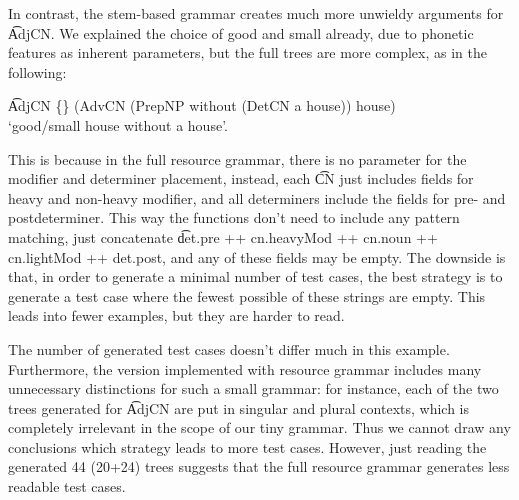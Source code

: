 In contrast, the stem-based grammar creates much more unwieldy
arguments for \t{AdjCN}. We explained the choice of good and small
already, due to phonetic features as inherent parameters, but the full
trees are more complex, as in the following:

\begin{EmptyItem}
\t{AdjCN \{\} (AdvCN (PrepNP without (DetCN a house))
  house)} \\ `good/small house without a house'.
\end{EmptyItem}

\noindent This is because in the full resource grammar, there is no parameter
for the modifier and determiner placement, instead, each \t{CN} just
includes fields for heavy and non-heavy modifier, and all determiners
include the fields for pre- and postdeterminer. This way the functions
don't need to include any pattern matching, just concatenate
\t{det.pre ++ cn.heavyMod ++ cn.noun ++ cn.lightMod ++ det.post}, and
any of these fields may be empty. The downside is that, in order to
generate a minimal number of test cases, the best strategy is to
generate a test case where the fewest possible of these strings are
empty. This leads into fewer examples, but they are harder to read.

The number of generated test cases doesn't differ much in this
example. Furthermore, the version implemented with resource grammar
includes many unnecessary distinctions for such a small grammar: for
instance, each of the two trees generated for \t{AdjCN} are put in
singular and plural contexts, which is completely irrelevant in the
scope of our tiny grammar.  Thus we cannot draw any conclusions which
strategy leads to more test cases. However, just reading the generated
44 (20+24) trees suggests that the full resource grammar generates less
readable test cases.






